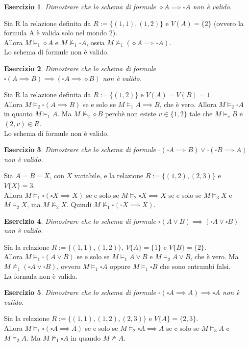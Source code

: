 \documentclass{article}
\theoremstyle{definition}
\theoremstyle{plain}
\theoremstyle{plain}
\theoremstyle{plain}
\theoremstyle{plain}
\newtheorem{esercizio}{Esercizio}
\begin{document}
\begin{esercizio}
    Dimostrare che lo schema di formule $\diamond A \implies \square A$ non è valido.
\end{esercizio}
Sia R la relazione definita da $R := \{(1, 1), (1, 2)\}$ e $V(A)=\{2\}$ (ovvero la formula A è valida solo nel mondo 2). \\
Allora $M \models_1 \diamond A$ e $M \not\models_1 \square A$, ossia $M \not\models_1 (\diamond A \implies \square A)$. \\
Lo schema di formule non è valido.

\begin{esercizio}
    Dimostrare che lo schema di formule $\square (A \implies B) \implies (\square A \implies \diamond B)$ non è valido.
\end{esercizio}
Sia R la relazione definita da $R := \{(1, 2)\}$ e $V(A) = V(B) = 1$. \\
Allora $M \models_2 \square (A \implies B)$ se e solo se $M \models_1 A \implies B$, che è vero. Allora $M \models_2 \square A$ in quanto $M \models_1 A$. Ma $M \not\models_2 \diamond B$ perchè non esiste $v \in \{1, 2\}$ tale che $M \models_v B$ e $(2, v) \in R$. \\
Lo schema di formule non è valido.

\begin{esercizio}
    Dimostrare che lo schema di formule $\square (\square A \implies B) \lor \square (\square B \implies A)$ non è valido.
\end{esercizio}
Sia $A = B = X$, con $X$ variabile, e la relazione $R := \{(1, 2), (2, 3)\}$ e $V\{X\} = 3$. \\ 
Allora $M \models_1 \square(\square X \implies X)$ se e solo se $M \models_2 \square X \implies X$ se e solo se $M \models_3 X$ e $M \models_2 X$, ma $M \not\models_2 X$. Quindi $M \not\models_1 \square(\square X \implies X)$.

\begin{esercizio}
    Dimostrare che lo schema di formule $\square (A \lor B) \implies (\square A \lor \square B)$ non è valido.
\end{esercizio}
Sia la relazione $R := \{(1, 1), (1, 2)\}$, $V\{A\} =  \{1\}$ e $V\{B\} =  \{2\}$. \\
Allora $M \models_1 \square (A \lor B)$ se e solo se $M \models_1 A \lor B$ e $M \models_2 A \lor B$, che è vero. Ma $M \not\models_1 (\square A \lor \square B)$, ovvero $M \models_1 \square A$ oppure $M \models_1 \square B$ che sono entrambi falsi. \\
La formula non è valida.

\begin{esercizio}
    Dimostrare che lo schema di formule $\square (\square A \implies A) \implies \square A$ non è valido.
\end{esercizio}
Sia la relazione $R := \{(1, 1), (1, 2), (2, 3)\}$ e $V\{A\} =  \{2, 3\}$. \\ 
Allora $M \models_1 \square (\square A \implies A)$ se e solo se $M \models_2 \square A \implies A$ se e solo se $M \models_3 A$ e $M \models_2 A$. Ma $M \not\models_1 \square A$ in quando $M \not\models A$.
\end{document}
